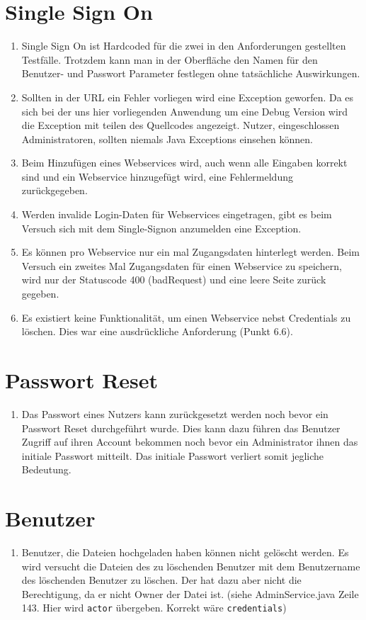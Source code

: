 \documentclass[12pt,DIV14,BCOR10mm,a4paper,parskip=half-,headsepline,headinclude,english,ngerman,bibliography=totocnumbered]{scrreprt}
\begin{document}
\section{Single Sign On}
\begin{enumerate}[resume]
 \item Single Sign On ist Hardcoded für die zwei in den Anforderungen gestellten Testfälle. Trotzdem kann man in der Oberfläche den Namen für den Benutzer- und Passwort Parameter festlegen ohne tatsächliche Auswirkungen.
  \item Sollten in der URL ein Fehler vorliegen wird eine Exception geworfen. Da es sich bei der uns hier vorliegenden Anwendung um eine Debug Version wird die Exception mit teilen des Quellcodes angezeigt. Nutzer, eingeschlossen Administratoren, sollten niemals Java Exceptions einsehen können.
  \item Beim Hinzufügen eines Webservices wird, auch wenn alle Eingaben korrekt sind und ein Webservice hinzugefügt wird, eine Fehlermeldung zurückgegeben.
     \item Werden invalide Login-Daten für Webservices eingetragen, gibt es beim Versuch sich mit dem Single-Signon anzumelden eine Exception.
\item Es können pro Webservice nur ein mal Zugangsdaten hinterlegt werden. Beim Versuch ein zweites Mal Zugangsdaten für einen Webservice zu speichern, wird nur der Statuscode 400 (badRequest) und eine leere Seite zurück gegeben.
\item Es existiert keine Funktionalität, um einen Webservice nebst Credentials zu löschen. Dies war eine ausdrückliche Anforderung (Punkt 6.6).
 \end{enumerate}
 
 \section{Passwort Reset}
\begin{enumerate}[resume]
 \item Das Passwort eines Nutzers kann zurückgesetzt werden noch bevor ein Passwort Reset durchgeführt wurde. Dies kann dazu führen das Benutzer Zugriff auf ihren Account bekommen noch bevor ein Administrator ihnen das initiale Passwort mitteilt. Das initiale Passwort verliert somit jegliche Bedeutung.
  \end{enumerate}


\section{Benutzer}
\begin{enumerate}[resume]

  \item Benutzer, die Dateien hochgeladen haben können nicht gelöscht werden. Es wird versucht die Dateien des zu löschenden Benutzer mit dem Benutzername des löschenden Benutzer zu löschen. Der hat dazu aber nicht die Berechtigung, da er nicht Owner der Datei ist. (siehe AdminService.java Zeile 143. Hier wird \texttt{actor} übergeben. Korrekt wäre \texttt{credentials})
 \end{enumerate}
\end{document}
